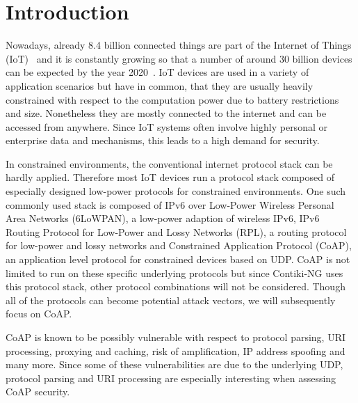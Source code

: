 \section{Introduction}
\label{section:introduction}


Nowadays, already 8.4 billion connected things are part of the Internet of Things (IoT)~\cite{IoTForecastGartner} and it is constantly growing so that a number of around 30 billion devices can be expected by the year 2020~\cite{IoTForecastNordrum}. IoT devices are used in a variety of application scenarios but have in common, that they are usually heavily constrained with respect to the computation power due to battery restrictions and size. Nonetheless they are mostly connected to the internet and can be accessed from anywhere. Since IoT systems often involve highly personal or enterprise data and mechanisms, this leads to a high demand for security. 

In constrained environments, the conventional internet protocol stack can be hardly applied. Therefore most IoT devices run a protocol stack composed of especially designed low-power protocols for constrained environments. One such commonly used stack is composed of IPv6 over Low-Power Wireless Personal Area Networks (6LoWPAN), a low-power adaption of wireless IPv6, IPv6 Routing Protocol for Low-Power and Lossy Networks (RPL), a routing protocol for low-power and lossy networks and Constrained Application Protocol (CoAP), an application level protocol for constrained devices based on UDP. CoAP is not limited to run on these specific underlying protocols but since Contiki-NG uses this protocol stack, other protocol combinations will not be considered. Though all of the protocols can become potential attack vectors, we will subsequently focus on CoAP. 

CoAP is known to be possibly vulnerable with respect to protocol parsing, URI processing, proxying and caching, risk of amplification, IP address spoofing and many more. Since some of these vulnerabilities are due to the underlying UDP, protocol parsing and URI processing are especially interesting when assessing CoAP security.

